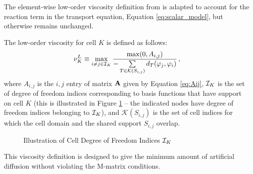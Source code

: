 The element-wise low-order viscosity definition from \cite{guermond_firstorder} is
adapted to account for the reaction term in the transport equation,
Equation \eqref{eq:scalar_model}, but otherwise remains unchanged.
\begin{defn}
  The low-order viscosity for cell $K$ is defined as follows:
  \begin{equation}
    \nu^L_K \equiv \max\limits_{i\ne j\in\mathcal{I}_K}
      \frac{\max(0,A_{i,j})}
      {-\sum\limits_{T\in \mathcal{K}(S_{i,j})}d_T(\varphi_j,\varphi_i)}
      \,,
  \end{equation}
  where $A_{i,j}$ is the $i,j$ entry of matrix $\mathbf{A}$
  given by Equation \eqref{eq:Aij}, $\mathcal{I}_K$ is the set of degree of freedom
  indices corresponding to basis functions that have support on cell $K$
  (this is illustrated in Figure \ref{fig:cell_indices} -- the indicated
  nodes have degree of freedom indices belonging to $\mathcal{I}_K$), and
  $\mathcal{K}(S_{i,j})$ is the set of cell indices for which the cell
  domain and the shared support $S_{i,j}$ overlap.
\end{defn}
\begin{figure}[ht]
   \centering
     
      \caption{Illustration of Cell Degree of Freedom Indices $\mathcal{I}_K$}
   \label{fig:cell_indices}
\end{figure}
This viscosity definition is designed to give the minimum amount of artificial
diffusion without violating the M-matrix conditions.

